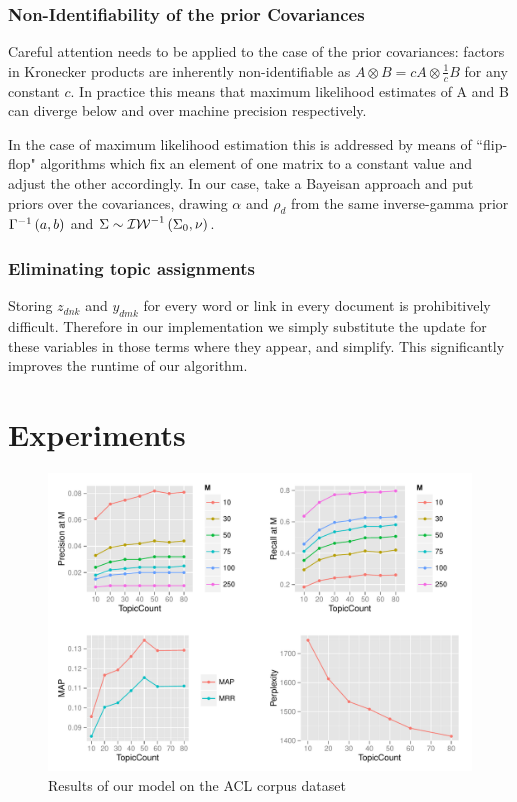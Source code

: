 \subsubsection*{Non-Identifiability of the prior Covariances}
Careful attention needs to be applied to the case of the prior covariances: factors in Kronecker products are inherently non-identifiable as $A \otimes B = c A \otimes \frac{1}{c} B$ for any constant $c$. In practice this means that maximum likelihood estimates of A and B can diverge below and over machine precision respectively.

In the case of maximum likelihood estimation this is addressed by means of ``flip-flop" algorithms\cite{Srivastava2009} which fix an element of one matrix to a constant value and adjust the other accordingly. In our case, take a Bayeisan approach and put priors over the covariances, drawing $\alpha$ and $\rho_d$ from the same inverse-gamma prior ${\Gamma}^{-1}\left(a, b\right)$ and $\Sigma \sim {\mathcal{IW}}^{-1}\left(\Sigma_0, \nu\right)$. 


\subsubsection*{Eliminating topic assignments}
Storing $z_{dnk}$ and $y_{dmk}$ for every word or link in every document is prohibitively difficult. Therefore in our implementation we simply substitute the update for these variables in those terms where they appear, and simplify. This significantly improves the runtime of our algorithm. 
\section{Experiments}

\begin{figure}
  \centering
    \hspace*{-1.5cm}\includegraphics[height=0.40\textheight]{plots/RPlot.pdf}
  \caption{Results of our model on the ACL corpus dataset}
  \label{fig:chap5-fig-self-1}
\end{figure}

